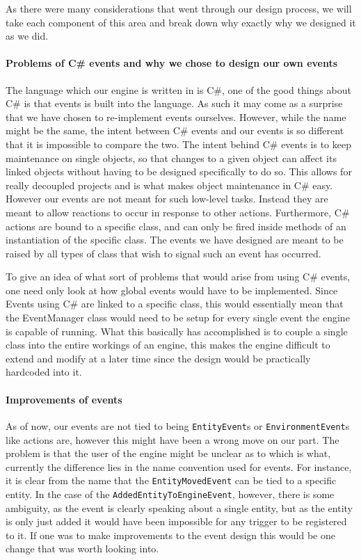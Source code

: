 As there were many considerations that went through our design process,
we will take each component of this area and break down why exactly
why we designed it as we did.


\paragraph*{Problems of C\# events and why we chose to design our own events}

The language which our engine is written in is C\#, one of the good
things about C\# is that events is built into the language. As such
it may come as a surprise that we have chosen to re-implement events
ourselves. However, while the name might be the same, the intent between
C\# events and our events is so different that it is impossible to
compare the two. The intent behind C\# events is to keep maintenance
on single objects, so that changes to a given object can affect its
linked objects without having to be designed specifically to do so.
This allows for really decoupled projects and is what makes object
maintenance in C\# easy. However our events are not meant for such
low-level tasks. Instead they are meant to allow reactions to occur
in response to other actions. Furthermore, C\# actions are bound to
a specific class, and can only be fired inside methods of an instantiation
of the specific class. The events we have designed are meant to be
raised by all types of class that wish to signal such an event has
occurred.

To give an idea of what sort of problems that would arise from using
C\# events, one need only look at how global events would have to
be implemented. Since Events using C\# are linked to a specific class,
this would essentially mean that the EventManager class would need
to be setup for every single event the engine is capable of running.
What this basically has accomplished is to couple a single class into
the entire workings of an engine, this makes the engine difficult
to extend and modify at a later time since the design would be practically
hardcoded into it. 


\paragraph*{Improvements of events}

As of now, our events are not tied to being \texttt{EntityEvent}s
or \texttt{EnvironmentEvent}s like actions are, however this might
have been a wrong move on our part. The problem is that the user of
the engine might be unclear as to which is what, currently the difference
lies in the name convention used for events. For instance, it is clear
from the name that the \texttt{EntityMovedEvent} can be tied to a
specific entity. In the case of the \texttt{AddedEntityToEngineEvent},
however, there is some ambiguity, as the event is clearly speaking
about a single entity, but as the entity is only just added it would
have been impossible for any trigger to be registered to it. If one
was to make improvements to the event design this would be one change
that was worth looking into.


